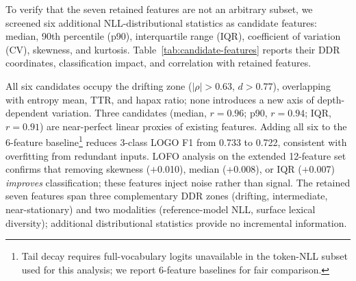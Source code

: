 To verify that the seven retained features are not an arbitrary subset, we screened six additional NLL-distributional statistics as candidate features: median, 90th percentile (p90), interquartile range (IQR), coefficient of variation (CV), skewness, and kurtosis.
Table~\ref{tab:candidate-features} reports their DDR coordinates, classification impact, and correlation with retained features.

\begin{table}[ht]
\centering
\small
\caption{Candidate feature screening. All six candidates fall in the drifting DDR zone and correlate strongly ($|r| > 0.65$) with existing features. Adding any combination to the baseline degrades or leaves unchanged LOGO 3-class F1; LOFO $\Delta > 0$ indicates that removing the candidate \emph{improves} classification.}
\label{tab:candidate-features}
\end{table}

 All six candidates occupy the drifting zone ($|\rho| > 0.63$, $d > 0.77$), overlapping with entropy mean, TTR, and hapax ratio; none introduces a new axis of depth-dependent variation.
Three candidates (median, $r{=}0.96$; p90, $r{=}0.94$; IQR, $r{=}0.91$) are near-perfect linear proxies of existing features.
Adding all six to the 6-feature baseline\footnote{Tail decay requires full-vocabulary logits unavailable in the token-NLL subset used for this analysis; we report 6-feature baselines for fair comparison.} reduces 3-class LOGO F1 from 0.733 to 0.722, consistent with overfitting from redundant inputs.
LOFO analysis on the extended 12-feature set confirms that removing skewness ($+$0.010), median ($+$0.008), or IQR ($+$0.007) \emph{improves} classification; these features inject noise rather than signal.
The retained seven features span three complementary DDR zones (drifting, intermediate, near-stationary) and two modalities (reference-model NLL, surface lexical diversity); additional distributional statistics provide no incremental information.
